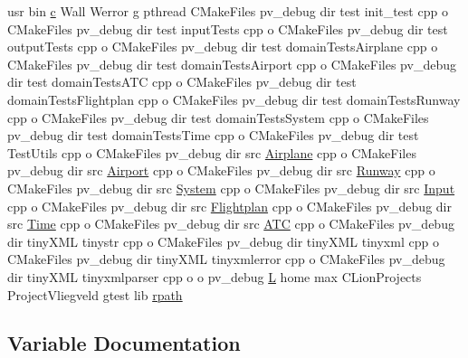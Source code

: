 \begin{DoxyCompactItemize}
\item 
usr bin \hyperlink{html_2jquery_8js_abce695e0af988ece0826d9ad59b8160d}{c} Wall Werror g pthread C\+Make\+Files pv\+\_\+debug dir test init\+\_\+test cpp o C\+Make\+Files pv\+\_\+debug dir test input\+Tests cpp o C\+Make\+Files pv\+\_\+debug dir test output\+Tests cpp o C\+Make\+Files pv\+\_\+debug dir test domain\+Tests\+Airplane cpp o C\+Make\+Files pv\+\_\+debug dir test domain\+Tests\+Airport cpp o C\+Make\+Files pv\+\_\+debug dir test domain\+Tests\+A\+TC cpp o C\+Make\+Files pv\+\_\+debug dir test domain\+Tests\+Flightplan cpp o C\+Make\+Files pv\+\_\+debug dir test domain\+Tests\+Runway cpp o C\+Make\+Files pv\+\_\+debug dir test domain\+Tests\+System cpp o C\+Make\+Files pv\+\_\+debug dir test domain\+Tests\+Time cpp o C\+Make\+Files pv\+\_\+debug dir test Test\+Utils cpp o C\+Make\+Files pv\+\_\+debug dir src \hyperlink{classAirplane}{Airplane} cpp o C\+Make\+Files pv\+\_\+debug dir src \hyperlink{classAirport}{Airport} cpp o C\+Make\+Files pv\+\_\+debug dir src \hyperlink{classRunway}{Runway} cpp o C\+Make\+Files pv\+\_\+debug dir src \hyperlink{classSystem}{System} cpp o C\+Make\+Files pv\+\_\+debug dir src \hyperlink{classInput}{Input} cpp o C\+Make\+Files pv\+\_\+debug dir src \hyperlink{classFlightplan}{Flightplan} cpp o C\+Make\+Files pv\+\_\+debug dir src \hyperlink{classTime}{Time} cpp o C\+Make\+Files pv\+\_\+debug dir src \hyperlink{classATC}{A\+TC} cpp o C\+Make\+Files pv\+\_\+debug dir tiny\+X\+ML tinystr cpp o C\+Make\+Files pv\+\_\+debug dir tiny\+X\+ML tinyxml cpp o C\+Make\+Files pv\+\_\+debug dir tiny\+X\+ML tinyxmlerror cpp o C\+Make\+Files pv\+\_\+debug dir tiny\+X\+ML tinyxmlparser cpp o o pv\+\_\+debug \hyperlink{html_2jquery_8js_a38ee4c0b5f4fe2a18d0c783af540d253}{L} home max C\+Lion\+Projects Project\+Vliegveld gtest lib \hyperlink{pv__debug_8dir_2link_8txt_ae8b558f985c615973c12ba077fbbb061}{rpath}
\end{DoxyCompactItemize}


\subsection{Variable Documentation}
